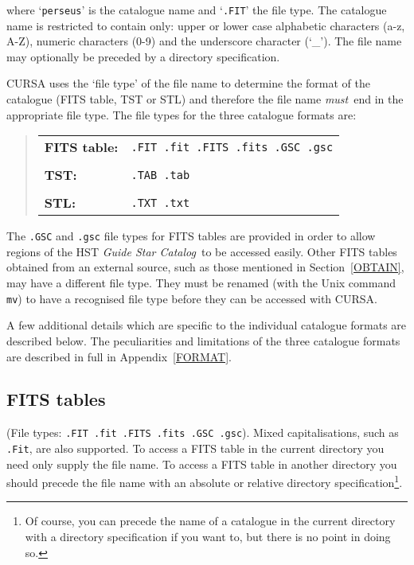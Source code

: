 \documentclass[twoside,11pt]{starlink}
\begin{document}
where `\texttt{perseus}' is the catalogue name and `\texttt{.FIT}' the file
type.  The catalogue name is restricted to contain only: upper or lower
case alphabetic characters (a-z, A-Z), numeric characters (0-9) and the
underscore character (`\_').  The file name may optionally be preceded by
a directory specification.

CURSA uses the `file type' of the file name to determine the format of
the catalogue (FITS table, TST or STL) and therefore the file name \textit{must}\, end in the appropriate file type.  The file types for the three
catalogue formats are:

\begin{quote}
\begin{tabular}{ll}
\textbf{FITS table:} & \texttt{.FIT .fit .FITS .fits .GSC .gsc}  \\
                  & \\
\textbf{TST:}        & \texttt{.TAB .tab}  \\
                  & \\
\textbf{STL:}        & \texttt{.TXT .txt}  \\
\end{tabular}
\end{quote}

The \texttt{.GSC} and \texttt{.gsc} file types for FITS tables are provided in
order to allow regions of the HST \textit{Guide Star Catalog}\, to be accessed
easily. Other FITS tables obtained from an external source, such as those
mentioned in Section~\ref{OBTAIN}, may have a different file type. They
must be renamed (with the Unix command \texttt{mv}) to have a recognised file
type before they can be accessed with CURSA.

A few additional details which are specific to the individual catalogue
formats are described below. The peculiarities and limitations of the
three catalogue formats are described in full in Appendix~\ref{FORMAT}.

\subsection{FITS tables}

(File types: \texttt{.FIT .fit .FITS .fits .GSC .gsc}).  Mixed
capitalisations, such as \texttt{.Fit}, are also supported.  To access a FITS
table in the current directory you need only supply the file name. To
access a FITS table in another directory you should precede the file name
with an absolute or relative directory specification\footnote{ Of course,
you can precede the name of a catalogue in the current directory with a
directory specification if you want to, but there is no point in doing
so.}.
\end{document}
